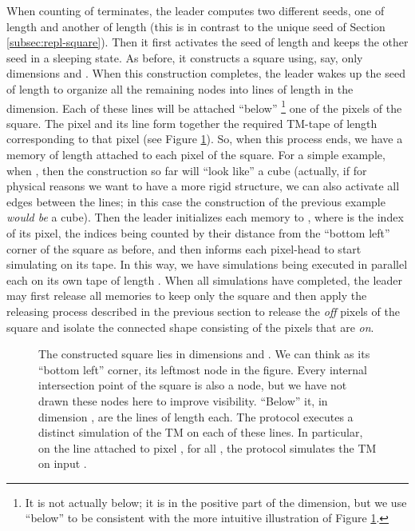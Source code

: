 \documentclass[oribibl, 11pt]{llncs}
\begin{document}
When counting of  terminates, the leader computes two different seeds, one of length  and another of length  (this is in contrast to the unique seed of Section \ref{subsec:repl-square}). Then it first activates the seed of length  and keeps the other seed in a sleeping state. As before, it constructs a  square using, say, only dimensions  and . When this construction completes, the leader wakes up the seed of length  to organize all the remaining nodes into lines of length  in the  dimension. Each of these lines will be attached ``below'' \footnote{It is not actually below; it is in the positive part of the  dimension, but we use ``below'' to be consistent with the more intuitive illustration of Figure \ref{fig:3d-par-simulations}.} one of the pixels of the square. The pixel and its line form together the required TM-tape of length  corresponding to that pixel (see Figure \ref{fig:3d-par-simulations}). So, when this process ends, we have a memory of length  attached to each pixel of the square. For a simple example, when , then the construction so far will ``look like'' a  cube (actually, if for physical reasons we want to have a more rigid structure, we can also activate all edges between the lines; in this case the construction of the previous example \emph{would be} a  cube). Then the leader initializes each memory to , where  is the index of its pixel, the indices being counted by their distance from the ``bottom left'' corner of the square as before, and then informs each pixel-head to start simulating  on its tape. In this way, we have  simulations being executed in parallel each on its own tape of length . When all simulations have completed, the leader may first release all memories to keep only the  square and then apply the releasing process described in the previous section to release the \emph{off} pixels of the square and isolate the connected shape consisting of the pixels that are \emph{on}.

\begin{figure}[!hbtp]
\caption{The constructed  square lies in dimensions  and . We can think as its ``bottom left'' corner, its leftmost node in the figure. Every internal intersection point of the square is also a node, but we have not drawn these nodes here to improve visibility. ``Below'' it, in dimension , are the  lines of length  each. The protocol executes a distinct simulation of the TM on each of these lines. In particular, on the line attached to pixel , for all , the protocol simulates the TM on input .} \label{fig:3d-par-simulations}
\end{figure}
\end{document}
